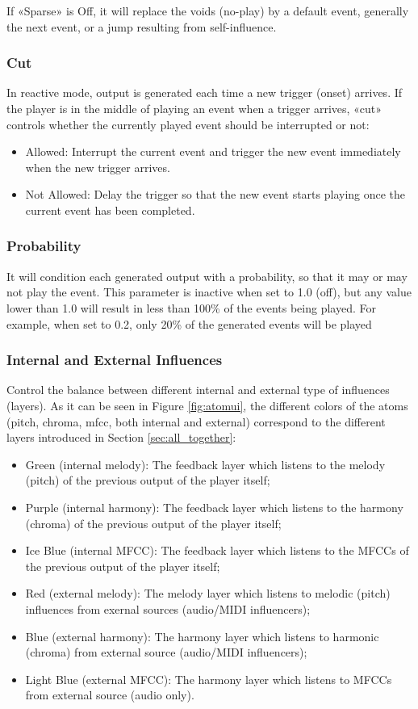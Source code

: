 \noindent If «Sparse» is Off, it will replace the voids (no-play) by a default event, generally the next event, or a jump resulting from self-influence.

\subsubsection{Cut}
In reactive mode, output is generated each time a new trigger (onset) arrives. If the player is in the middle of playing an event when a trigger arrives, «cut» controls whether the currently played event should be interrupted or not:

\begin{itemize}
    \item Allowed: Interrupt the current event and trigger the new event immediately when the new trigger arrives.
    \item Not Allowed: Delay the trigger so that the new event starts playing once the current event has been completed.
\end{itemize}

\subsubsection{Probability}
It will condition each generated output with a probability, so that it may or may not play the event. This parameter is inactive when set to 1.0 (off), but any value lower than 1.0 will result in less than 100\% of the events being played. For example, when set to 0.2, only 20\% of the generated events will be played

\subsubsection{Internal and External Influences}
Control the balance between different internal and external type of influences (layers).
As it can be seen in Figure \ref{fig:atomui}, the different colors of the atoms (pitch, chroma, mfcc, both internal and external) correspond to the different layers introduced in Section \ref{sec:all_together}:

\begin{itemize}
    \item Green (internal melody): The feedback layer which listens to the melody (pitch) of the previous output of the player itself;
    \item Purple (internal harmony): The feedback layer which listens to the harmony (chroma) of the previous output of the player itself;
       \item Ice Blue (internal MFCC): The feedback layer which listens to the MFCCs of the previous output of the player itself;
    \item Red (external melody): The melody layer which listens to melodic (pitch) influences from exernal sources (audio/MIDI influencers);
    \item Blue (external harmony): The harmony layer which listens to harmonic (chroma) from external source (audio/MIDI influencers);
    \item Light Blue (external MFCC): The harmony layer which listens to MFCCs from external source (audio only).
\end{itemize}

